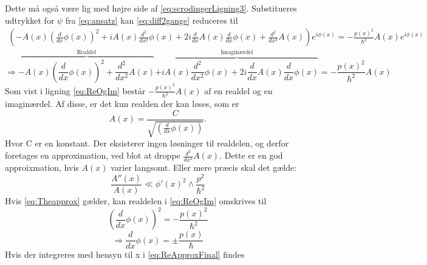 %
Dette må også være lig med højre side af \cref{eq:scrodingerLigning3}. Substitueres udtrykket for $\psi$ fra \cref{eq:ansatz} kan \cref{eq:diff2gange} reduceres til
%
\begin{align}
    \left(- A{\left (x \right )} \left(\frac{d}{d x} \phi{\left (x \right )}\right)^{2} + i A{\left (x \right )} \frac{d^{2}}{d x^{2}}  \phi{\left (x \right )} + 2 i \frac{d}{d x} A{\left (x \right )} \frac{d}{d x} \phi{\left (x \right )} + \frac{d^{2}}{d x^{2}}  A{\left (x \right )}\right) e^{i \phi{\left (x \right )}} = - \frac{p(x)^2}{\hbar^2} A(x) e^{i \phi(x)}
    \label{eq:udskrevet}
\end{align}
%
\begin{equation}
     \Rightarrow
     \overbrace{- A{\left(x \right)} \left(\frac{d}{d x} \phi{\left(x \right)}\right)^{2}
     + \frac{d^{2}}{d x^{2}}  A{\left (x \right )}}^{\text{Realdel}}
     \overbrace{+ i A{\left(x \right)} \frac{d^{2}}{d x^{2}}  \phi{\left(x \right)}
     + 2 i \frac{d}{d x} A{\left(x \right)} \frac{d}{d x} \phi{\left (x \right )}}^{\text{Imaginærdel}}
     = - \frac{p(x)^2}{\hbar^2} A(x)
     \label{eq:ReOgIm}
\end{equation}
%
Som vist i ligning \cref{eq:ReOgIm} består $- \frac{p(x)^2}{\hbar^2} A(x)$ af en realdel og en imaginærdel. Af disse, er det kun realden der kan løses, som er
%
\begin{equation}
    A(x) = \frac{C}{\sqrt{(\frac{d}{d x} \phi{\left (x \right )})}}.
    \label{eq:ImLoes}
\end{equation}
%
Hvor C er en konstant. Der eksisterer ingen løsninger til realdelen, og derfor foretages en approximation, ved blot at droppe $\frac{d^{2}}{d x^{2}}  A{\left (x \right )}$. Dette er en god approixmation, hvis $A(x)$ varier langsomt. Eller mere præcis skal det gælde:
\begin{equation}
    \frac{A''(x)}{A(x)} \ll \phi'(x)^{2}\wedge \frac{p^{2}}{\hbar^{2}}
    \label{eq:Theapprox}
\end{equation}
%
Hvis \cref{eq:Theapprox} gælder, kan realdelen i \cref{eq:ReOgIm} omskrives til
%
\begin{equation}
    \left(\frac{d}{d x} \phi{\left (x \right )}\right)^{2}
    = - \frac{p(x)^2}{\hbar^2}
    \label{eq:ReApprox}
\end{equation}
%
\begin{equation}
    \Rightarrow \frac{d}{d x} \phi{\left (x \right )}
    = \pm \frac{p(x)}{\hbar}
    \label{eq:ReApproxFinal}
\end{equation}
%
Hvis der integreres med hensyn til x i \cref{eq:ReApproxFinal} findes
